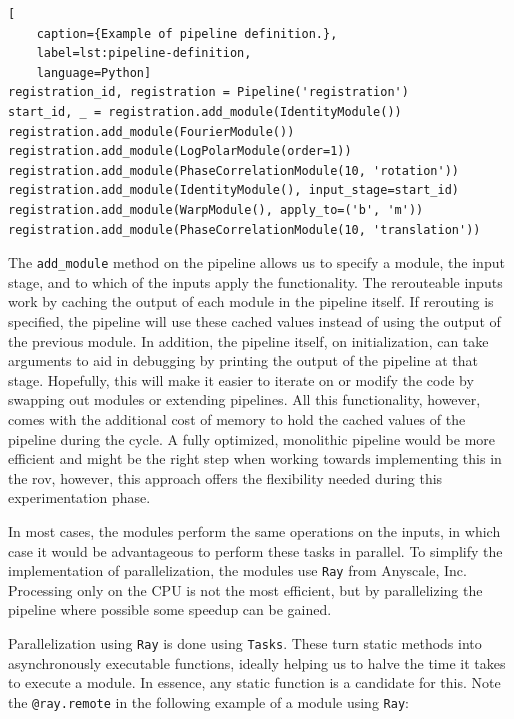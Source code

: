 \begin{lstlisting}[
    caption={Example of pipeline definition.},
    label=lst:pipeline-definition,
    language=Python]
registration_id, registration = Pipeline('registration')
start_id, _ = registration.add_module(IdentityModule())
registration.add_module(FourierModule())
registration.add_module(LogPolarModule(order=1))
registration.add_module(PhaseCorrelationModule(10, 'rotation'))
registration.add_module(IdentityModule(), input_stage=start_id)
registration.add_module(WarpModule(), apply_to=('b', 'm'))
registration.add_module(PhaseCorrelationModule(10, 'translation'))
\end{lstlisting}

The \lstinline{add_module} method on the pipeline allows us to specify a module, the input stage, and to which of the inputs apply the functionality. The rerouteable inputs work by caching the output of each module in the pipeline itself. If rerouting is specified, the pipeline will use these cached values instead of using the output of the previous module. In addition, the pipeline itself, on initialization, can take arguments to aid in debugging by printing the output of the pipeline at that stage. Hopefully, this will make it easier to iterate on or modify the code by swapping out modules or extending pipelines. All this functionality, however, comes with the additional cost of memory to hold the cached values of the pipeline during the cycle. A fully optimized, monolithic pipeline would be more efficient and might be the right step when working towards implementing this in the \acrshort{rov}, however, this approach offers the flexibility needed during this experimentation phase.

In most cases, the modules perform the same operations on the inputs, in which case it would be advantageous to perform these tasks in parallel. To simplify the implementation of parallelization, the modules use \texttt{Ray} from Anyscale, Inc. Processing only on the CPU is not the most efficient, but by parallelizing the pipeline where possible some speedup can be gained.

Parallelization using \texttt{Ray} is done using \texttt{Tasks}. These turn static methods into asynchronously executable functions, ideally helping us to halve the time it takes to execute a module. In essence, any static function is a candidate for this. Note the \lstinline{@ray.remote} in the following example of a module using \texttt{Ray}:

